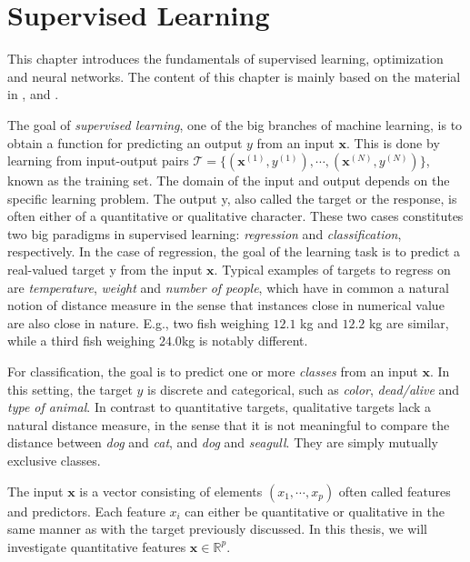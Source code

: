 \chapter{Supervised Learning}\label{chap:SupervisedLearning}

This chapter introduces the fundamentals of supervised learning, optimization and neural networks. The content of this chapter is mainly based on the material in \cite{SupervisedwquantumComputers}, \cite{hastie01statisticallearning} and \cite{nielsenneural}.

The goal of \emph{supervised learning}, one of the big branches of machine learning, is to obtain a function for predicting an output $y$ from an input $\boldsymbol{x}$. This is done by learning from input-output pairs $\mathcal{T} = \{(\boldsymbol{x}^{(1)}, y^{(1)}), \cdots, (\boldsymbol{x}^{(N)}, y^{(N)})\}$, known as the training set. The domain of the input and output depends on the specific learning problem. The output y, also called the target or the response, is often either of a quantitative or qualitative character. These two cases constitutes two big paradigms in supervised learning: \emph{regression} and \emph{classification}, respectively. In the case of regression, the goal of the learning task is to predict a real-valued target y from the input $\boldsymbol{x}$. Typical examples of targets to regress on are \emph{temperature}, \emph{weight} and \emph{number of people}, which have in common a natural notion of distance measure in the sense that instances close in numerical value are also close in nature. E.g., two fish weighing $12.1$ kg and $12.2$ kg are similar, while a third fish weighing $24.0$kg is notably different.

For classification, the goal is to predict one or more \emph{classes} from an input $\boldsymbol{x}$. In this setting, the target $y$ is discrete and categorical, such as \emph{color}, \emph{dead/alive} and \emph{type of animal}. In contrast to quantitative targets, qualitative targets lack a natural distance measure, in the sense that it is not meaningful to compare the distance between \emph{dog} and \emph{cat}, and \emph{dog} and \emph{seagull}. They are simply mutually exclusive classes.

The input $\boldsymbol{x}$ is a vector consisting of elements $(x_1, \cdots, x_p)$ often called features and predictors. Each feature $x_i$ can either be quantitative or qualitative in the same manner as with the target previously discussed. In this thesis, we will investigate quantitative features $\boldsymbol{x} \in \mathbb{R}^{p}$.



